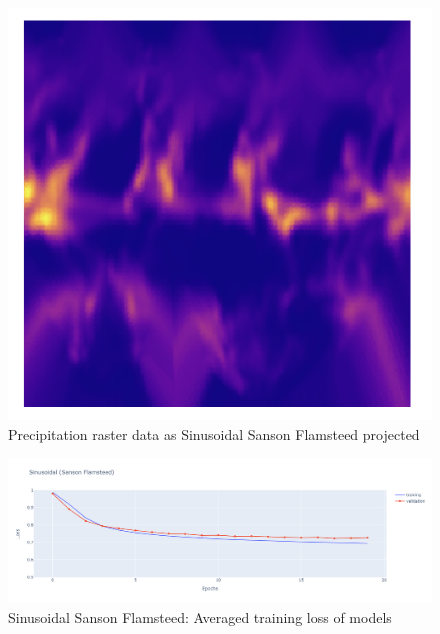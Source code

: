\begin{figure}[H]
\begin{minipage}{0.30\textwidth}
        \label{fig:sinu_proj}
    \end{minipage}\hfill
    \begin{minipage}{0.30\textwidth}
        \centering
        \includegraphics[width=0.9\linewidth]{figures/chapter-8/prect_goode.png}
        \caption{Precipitation raster data as Sinusoidal Sanson Flamsteed projected}
        \label{fig:sinu_prect_raster}
    \end{minipage}\hfill
\end{figure}


\begin{figure}[H]
    \centering
    \includegraphics[width=1.0\linewidth]{figures/chapter-8/sinu_loss.png}
    \caption{Sinusoidal Sanson Flamsteed: Averaged training loss of models  }
    \label{fig:sinu_loss}
\end{figure}


